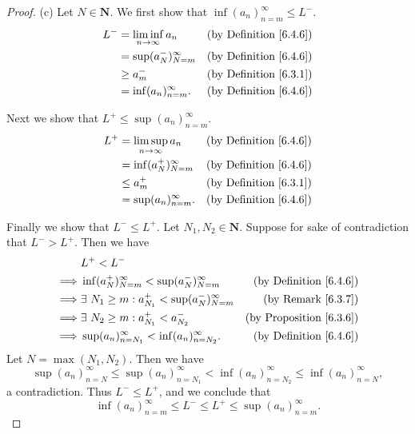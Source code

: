 \begin{proof}{(c)}
    Let \(N \in \mathbf{N}\).
    We first show that \(\inf(a_n)_{n = m}^\infty \leq L^-\).
    \begin{align*}
        L^- & = \liminf_{n \to \infty} a_n & \text{(by Definition \ref{6.4.6})} \\
            & = \sup(a_N^-)_{N = m}^\infty & \text{(by Definition \ref{6.4.6})} \\
            & \geq a_m^-                   & \text{(by Definition \ref{6.3.1})} \\
            & = \inf(a_n)_{n = m}^\infty.  & \text{(by Definition \ref{6.4.6})}
    \end{align*}

    Next we show that \(L^+ \leq \sup(a_n)_{n = m}^\infty\).
    \begin{align*}
        L^+ & = \limsup_{n \to \infty} a_n & \text{(by Definition \ref{6.4.6})} \\
            & = \inf(a_N^+)_{N = m}^\infty & \text{(by Definition \ref{6.4.6})} \\
            & \leq a_m^+                   & \text{(by Definition \ref{6.3.1})} \\
            & = \sup(a_n)_{n = m}^\infty.  & \text{(by Definition \ref{6.4.6})}
    \end{align*}

    Finally we show that \(L^- \leq L^+\).
    Let \(N_1, N_2 \in \mathbf{N}\).
    Suppose for sake of contradiction that \(L^- > L^+\).
    Then we have
    \begin{align*}
                 & L^+ < L^-                                                                                          \\
        \implies & \inf(a_N^+)_{N = m}^\infty < \sup(a_N^-)_{N = m}^\infty      & \text{(by Definition \ref{6.4.6})}  \\
        \implies & \exists\ N_1 \geq m : a_{N_1}^+ < \sup(a_N^-)_{N = m}^\infty & \text{(by Remark \ref{6.3.7})}      \\
        \implies & \exists\ N_2 \geq m : a_{N_1}^+ < a_{N_2}^-                  & \text{(by Proposition \ref{6.3.6})} \\
        \implies & \sup(a_n)_{n = N_1}^\infty < \inf(a_n)_{n = N_2}^\infty.     & \text{(by Definition \ref{6.4.6})}
    \end{align*}
    Let \(N = \max(N_1, N_2)\).
    Then we have
    \[
        \sup(a_n)_{n = N}^\infty \leq \sup(a_n)_{n = N_1}^\infty < \inf(a_n)_{n = N_2}^\infty \leq \inf(a_n)_{n = N}^\infty,
    \]
    a contradiction.
    Thus \(L^- \leq L^+\), and we conclude that
    \[
        \inf(a_n)_{n = m}^\infty \leq L^- \leq L^+ \leq \sup(a_n)_{n = m}^\infty.
    \]
\end{proof}

